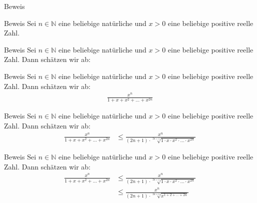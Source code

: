 \documentclass[10pt]{beamer}
\def\bN{\mathbb{N}}
\begin{document}
\begin{frame}{Beweis}
    
\end{frame}



\begin{frame}{Beweis}
    Sei \( n \in \bN \) eine beliebige natürliche und \( x > 0 \) eine beliebige positive reelle Zahl.    
\end{frame}



\begin{frame}{Beweis}
    Sei \( n \in \bN \) eine beliebige natürliche und \( x > 0 \) eine beliebige positive reelle Zahl. Dann schätzen wir ab:    
\end{frame}



\begin{frame}{Beweis}
    Sei \( n \in \bN \) eine beliebige natürliche und \( x > 0 \) eine beliebige positive reelle Zahl. Dann schätzen wir ab:
    \begin{align*}
        \frac{x^{n}}{1 + x + x^{2} + \ldots + x^{2n}}
    \end{align*}
\end{frame}



\begin{frame}{Beweis}
    Sei \( n \in \bN \) eine beliebige natürliche und \( x > 0 \) eine beliebige positive reelle Zahl. Dann schätzen wir ab:
    \begin{align*}
        \frac{x^{n}}{1 + x + x^{2} + \ldots + x^{2n}}
        & \leq \frac{x^{n}}{\left( 2n + 1 \right) \cdot \sqrt[2n + 1]{1 \cdot x \cdot x^{2} \cdot \ldots \cdot x^{2n}}}
    \end{align*}
\end{frame}



\begin{frame}{Beweis}
    Sei \( n \in \bN \) eine beliebige natürliche und \( x > 0 \) eine beliebige positive reelle Zahl. Dann schätzen wir ab:
    \begin{align*}
        \frac{x^{n}}{1 + x + x^{2} + \ldots + x^{2n}}
        & \leq \frac{x^{n}}{\left( 2n + 1 \right) \cdot \sqrt[2n + 1]{1 \cdot x \cdot x^{2} \cdot \ldots \cdot x^{2n}}} \\
        & \leq \frac{x^{n}}{\left( 2n + 1 \right) \cdot \sqrt[2n + 1]{x^{1 + 2 + \ldots + 2n}}}
    \end{align*}
\end{frame}
\end{document}
